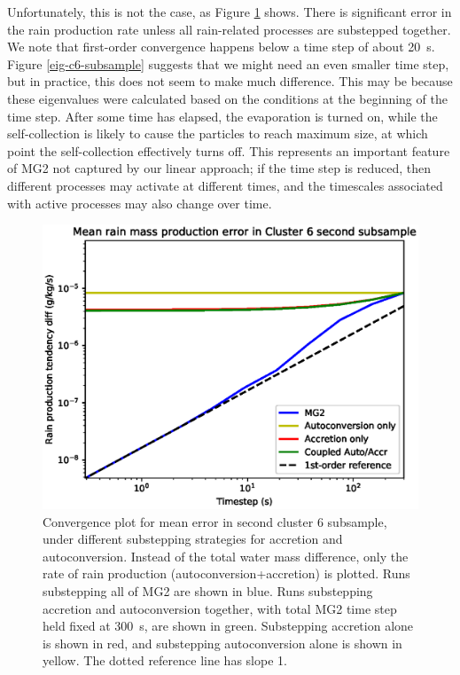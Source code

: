\documentclass [11pt, proquest] {uwthesis}[2020/02/24]
\begin{document}
Unfortunately, this is not the case, as Figure \ref{convergence-accr-auto2} shows. There is significant error in the rain production rate unless all rain-related processes are substepped together. We note that first-order convergence happens below a time step of about \SI{20}{\second}. Figure \ref{eig-c6-subsample} suggests that we might need an even smaller time step, but in practice, this does not seem to make much difference. This may be because these eigenvalues were calculated based on the conditions at the beginning of the time step. After some time has elapsed, the evaporation is turned on, while the self-collection is likely to cause the particles to reach maximum size, at which point the self-collection effectively turns off. This represents an important feature of MG2 not captured by our linear approach; if the time step is reduced, then different processes may activate at different times, and the timescales associated with active processes may also change over time.

\begin{figure}[htbp]
  \includegraphics[width=6.5in]{./substep_convergence_prod_c6_initicefilter_richext.eps}
  \caption[Convergence plot for mean MG2 error in a subsample of a cluster of rain-producing grid cells using different substepping strategies]{Convergence plot for mean error in second cluster 6 subsample, under different substepping strategies for accretion and autoconversion. Instead of the total water mass difference, only the rate of rain production (autoconversion+accretion) is plotted. Runs substepping all of MG2 are shown in blue. Runs substepping accretion and autoconversion together, with total MG2 time step held fixed at \SI{300}{\second}, are shown in green. Substepping accretion alone is shown in red, and substepping autoconversion alone is shown in yellow. The dotted reference line has slope \num{1}.}
  \label{convergence-accr-auto2}
\end{figure}
\end{document}
